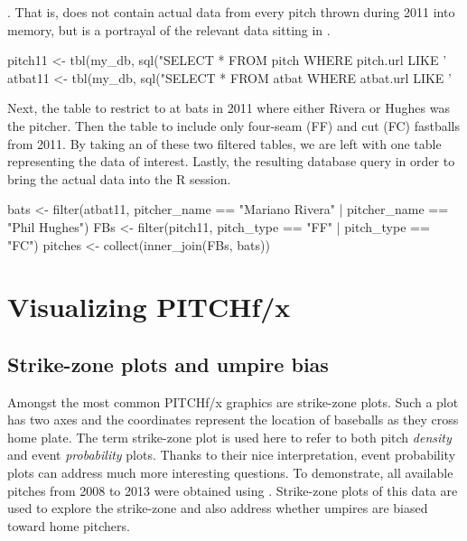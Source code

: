 \begin{article}
.  That is,  does not contain actual data
from every pitch thrown during 2011 into memory, but is a portrayal of
the relevant data sitting in .
%
\begin{Schunk}
\begin{Sinput}
pitch11 <- tbl(my_db, sql("SELECT * FROM pitch WHERE pitch.url LIKE '%year_2011%'"))
atbat11 <- tbl(my_db, sql("SELECT * FROM atbat WHERE atbat.url LIKE '%year_2011%'"))
\end{Sinput}
\end{Schunk}
%
Next,  the  table to restrict to at bats
in 2011 where either Rivera or Hughes was the pitcher. Then 
the  table to include only four-seam (FF) and cut (FC)
fastballs from 2011. By taking an  of these two
filtered tables, we are left with one table representing the data
of interest. Lastly,  the resulting database query
in order to bring the actual data into the R session.
%
\begin{Schunk}
\begin{Sinput}
bats <- filter(atbat11, 
  pitcher_name == "Mariano Rivera" | pitcher_name == "Phil Hughes")
FBs <- filter(pitch11, pitch_type == "FF" | pitch_type == "FC")
pitches <- collect(inner_join(FBs, bats))
\end{Sinput}
\end{Schunk}

\section{Visualizing PITCHf/x}

\subsection{Strike-zone plots and umpire bias}

Amongst the most common PITCHf/x graphics are strike-zone plots. Such
a plot has two axes and the coordinates represent the location of
baseballs as they cross home plate. The term strike-zone plot is used
here to refer to both pitch \emph{density} and event \emph{probability}
plots. Thanks to their nice interpretation, event probability plots
can address much more interesting questions. To demonstrate, all available
pitches from 2008 to 2013 were obtained using . Strike-zone
plots of this data are used to explore the strike-zone and also address
whether umpires are biased toward home pitchers.


\end{article}
